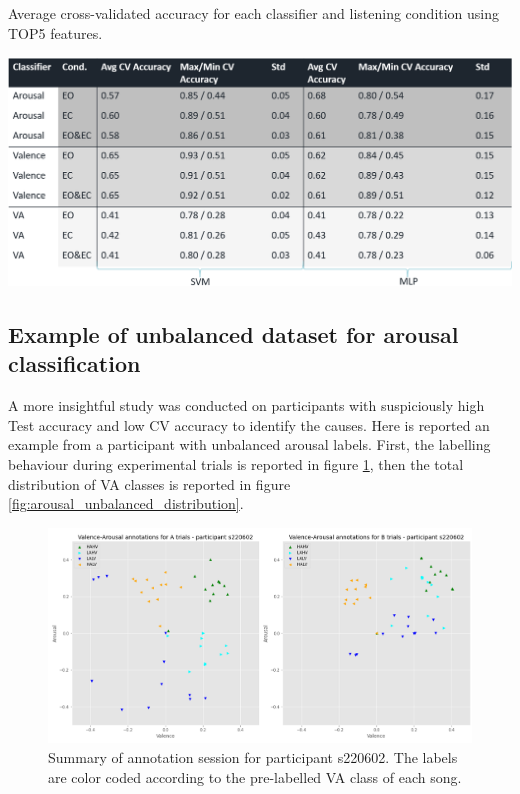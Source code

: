 \begin{table}[h!]
  \caption{Average cross-validated accuracy for each classifier and listening condition using TOP5 features.}
  \label{tbl:top5_cv_experiment}
  \includegraphics[width=\linewidth]{img/appendix/top5_cv_experiment.png}
\end{table}

\FloatBarrier
\subsection{Example of unbalanced dataset for arousal classification}
\label{sec:appendix_A3.3.1}
A more insightful study was conducted on participants with suspiciously high Test accuracy and low CV accuracy to identify the causes. Here is reported an example from a participant with unbalanced arousal labels. First, the labelling behaviour during experimental trials is reported in figure \ref{fig:arousal_unbalanced}, then the total distribution of \ac{VA} classes is reported in figure \ref{fig:arousal_unbalanced_distribution}.

\begin{figure}[!htb]
\includegraphics[width=16cm]{img/appendix/arousal_unbalanced.png}
\centering
\caption{Summary of annotation session for participant s220602. The labels are color coded according to the pre-labelled 
VA class of each song.}\label{fig:arousal_unbalanced}
\end{figure}

